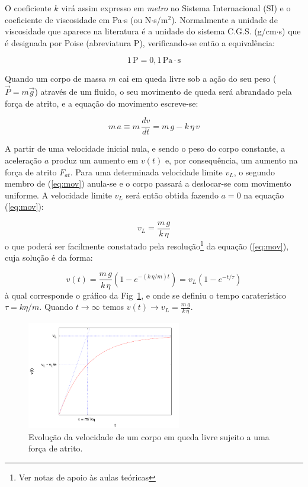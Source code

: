 \documentclass[12pt,a4paper,oneside]{paper}
\begin{document}
O coeficiente $k$ virá assim expresso em \emph{metro} no Sistema Internacional (SI) e o coeficiente de viscosidade em Pa$\cdot$s
(ou N$\cdot$s/m$^2$).
Normalmente a unidade de viscosidade que aparece na literatura é a unidade do sistema C.G.S. (g/cm$\cdot$s) que é designada por
Poise (abreviatura P), verificando-se então a equivalência:

\begin{equation*}
	1 \, \mathrm{P} = 0,1\, \mathrm{Pa}\cdot\mathrm{s}
\end{equation*}

Quando um corpo de massa $m$ cai em queda livre sob a ação do seu peso ($\vec{P}=m\vec{g}$) através de um fluido, o seu
movimento de queda será abrandado pela força de atrito, e a equação do movimento escreve-se:

\begin{equation}
	\label{eq:mov}
	m\,a \equiv m\, \frac{dv}{dt} =  m\,g - k  \, \eta \, v
\end{equation}

A partir de uma velocidade inicial nula, e sendo o peso do corpo constante, a aceleração $a$ produz um aumento  em $v(t)$
e, por consequência, um aumento na força de atrito $F_{at}$. Para uma determinada velocidade limite $v_L$, o segundo membro
de (\ref{eq:mov}) anula-se e o corpo passará a deslocar-se com movimento uniforme. A velocidade limite $v_L$ será então obtida
fazendo $a= 0$ na equação (\ref{eq:mov}):

\begin{equation}
	\label{eq:vlimit}
	v_L = \frac{m\,g}{k  \, \eta}
\end{equation}
o que poderá ser facilmente constatado pela resolução\footnote{Ver notas de apoio às aulas teóricas} da equação (\ref{eq:mov}),
cuja solução é da forma:

\begin{equation}
	\label{eq:vlimita}
	v(t) = \frac{m\,g}{k  \, \eta} (1 - e^{- (k\,\eta / m) t}) = v_L (1-e^{-t/\tau})
\end{equation}
à qual corresponde o gráfico  da Fig~\ref{fig:vLim}, e onde se definiu o tempo caraterístico $\tau=k\eta/m$. Quando
$t \to \infty$ temos $v(t) \to v_L = \frac{m\,g}{k  \, \eta} $.



\begin{figure}[H]
  \centering 
	\includegraphics[width=0.6\textwidth]{./milikan_images/plote}
	\caption{ Evolução da velocidade de um corpo em queda livre sujeito a uma força de atrito. \label{fig:vLim}} 
\end{figure}
\end{document}
